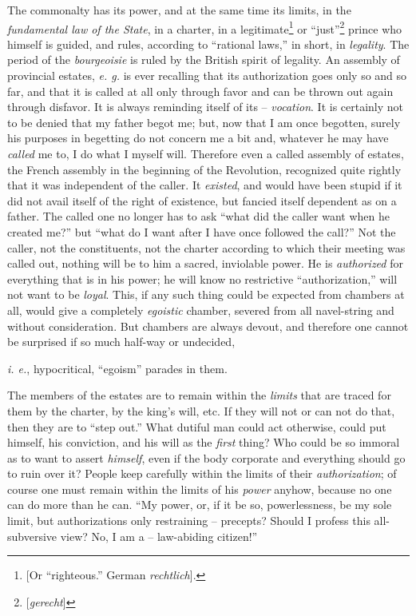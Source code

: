 \documentclass[12pt,a4paper]{book}
\begin{document}
The commonalty has its power, and at the same time its limits, in the 
\textit{fundamental law of the State}, in a charter, in a 
legitimate\footnote{[Or ``righteous.'' German \textit{rechtlich}].} or 
``just''\footnote{[\textit{gerecht}]} prince who himself is guided, and 
rules, according to ``rational laws,'' in short, in \textit{legality}. The 
period of the \textit{bourgeoisie} is ruled by the British spirit of legality. 
An assembly of provincial estates, \textit{e. g.} is ever recalling that its 
authorization goes only so and so far, and that it is called at all only 
through favor and can be thrown out again through disfavor. It is always 
reminding itself of its -- \textit{vocation}. It is certainly not to be denied 
that my father begot me; but, now that I am once begotten, surely his purposes 
in begetting do not concern me a bit and, whatever he may have \textit{called} 
me to, I do what I myself will. Therefore even a called assembly of estates, 
the French assembly in the beginning of the Revolution, recognized quite 
rightly that it was independent of the caller. It \textit{existed}, and would 
have been stupid if it did not avail itself of the right of existence, but 
fancied itself dependent as on a father. The called one no longer has to ask 
``what did the caller want when he created me?'' but ``what do I want after 
I have once followed the call?'' Not the caller, not the constituents, not 
the charter according to which their meeting was called out, nothing will be 
to him a sacred, inviolable power. He is \textit{authorized} for everything 
that is in his power; he will know no restrictive ``authorization,'' will 
not want to be \textit{loyal}. This, if any such thing could be expected from 
chambers at all, would give a completely \textit{egoistic} chamber, severed 
from all navel-string and without consideration. But chambers are always 
devout, and therefore one cannot be surprised if so much half-way or 
undecided,

\textit{i. e.}, hypocritical, ``egoism'' parades in them.

The members of the estates are to remain within the \textit{limits} that are 
traced for them by the charter, by the king's will, etc. If they will not or 
can not do that, then they are to ``step out.'' What dutiful man could act 
otherwise, could put himself, his conviction, and his will as the 
\textit{first} thing? Who could be so immoral as to want to assert 
\textit{himself}, even if the body corporate and everything should go to ruin 
over it? People keep carefully within the limits of their 
\textit{authorization}; of course one must remain within the limits of his 
\textit{power} anyhow, because no one can do more than he can. ``My power, 
or, if it be so, powerlessness, be my sole limit, but authorizations only 
restraining -- precepts? Should I profess this all-subversive view? No, I am a 
-- law-abiding citizen!''
\end{document}
